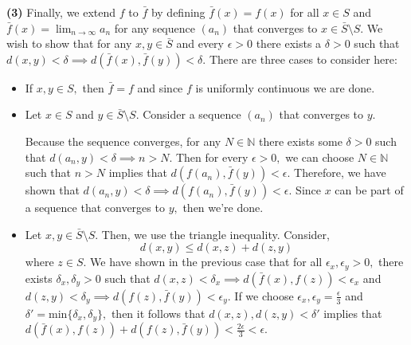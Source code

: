 \documentclass{article}
\numberwithin{equation}{section}
\begin{document}
\begin{enumerate}
\begin{enumerate}
        \textbf{(3)} Finally, we extend $f$ to $\bar{f}$ by defining $\bar{f}(x)=f(x)$ for all $x\in S$ and $\bar{f}(x)= \lim_{n\to \infty}a_n$ for any sequence $(a_n)$ that converges to $x \in \bar{S} \setminus S.$ We wish to show that for any $x,y\in \bar{S}$ and every $\epsilon>0$ there exists a $\delta > 0$ such that $d(x,y) < \delta \implies d(\bar{f}(x),\bar{f}(y)) < \delta.$ There are three cases to consider here:
        \begin{itemize}
            \item If $x,y\in S,$ then $\bar{f}=f$ and since $f$ is uniformly continuous we are done.
            \item Let $x\in S$ and $y\in \bar{S}\setminus S.$ Consider a sequence $(a_n)$ that converges to $y.$
            
            Because the sequence converges, for any $N\in \mathbb{N}$ there exists some $\delta > 0$ such that $d(a_n,y)<\delta \implies n>N.$ Then for every $\epsilon > 0,$ we can choose $N\in\mathbb{N}$ such that $n>N$ implies that $d(f(a_n),\bar{f}(y)) < \epsilon.$ Therefore, we have shown that $d(a_n,y)<\delta \implies d(f(a_n),\bar{f}(y)) < \epsilon.$ Since $x$ can be part of a sequence that converges to $y,$ then we're done.
            
            \item Let $x,y\in \bar{S} \setminus S.$ Then, we use the triangle inequality. Consider,
            \begin{equation}
                d(x,y) \le d(x,z) + d(z,y)
            \end{equation}
            where $z\in S.$ We have shown in the previous case that for all $\epsilon_x,\epsilon_y>0,$ there exists $\delta_x,\delta_y>0$ such that $d(x,z)<\delta_x \implies d(\bar{f}(x),f(z))<\epsilon_x$ and $d(z,y)<\delta_y \implies d(f(z),\bar{f}(y))<\epsilon_y.$ If we choose $\epsilon_x,\epsilon_y = \frac{\epsilon}{3}$ and $\delta'=\text{min}\{\delta_x,\delta_y\},$ then it follows that $d(x,z),d(z,y)<\delta'$ implies that $d(\bar{f}(x),f(z))+d(f(z),\bar{f}(y))<\frac{2\epsilon}{3}<\epsilon.$
            

\end{itemize}
\end{enumerate}
\end{enumerate}
\end{document}
